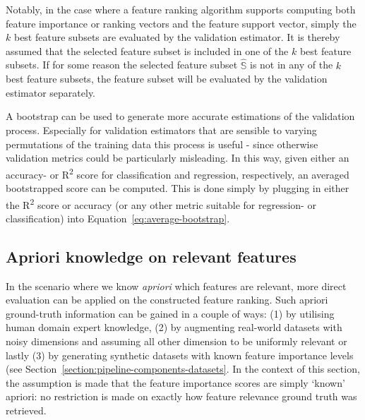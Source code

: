 \documentclass[../main.tex]{subfiles}
\begin{document}
Notably, in the case where a feature ranking algorithm supports computing both feature importance or ranking vectors and the feature support vector, simply the $k$ best feature subsets are evaluated by the validation estimator. It is thereby assumed that the selected feature subset is included in one of the $k$ best feature subsets. If for some reason the selected feature subset $\hat{\mathbb{S}}$ is not in any of the $k$ best feature subsets, the feature subset will be evaluated by the validation estimator separately.

A bootstrap can be used to generate more accurate estimations of the validation process. Especially for validation estimators that are sensible to varying permutations of the training data this process is useful - since otherwise validation metrics could be particularly misleading. In this way, given either an accuracy- or R\textsuperscript{2} score for classification and regression, respectively, an averaged bootstrapped score can be computed. This is done simply by plugging in either the R\textsuperscript{2} score or accuracy (or any other metric suitable for regression- or classification) into Equation~\ref{eq:average-bootstrap}.





\subsection{Apriori knowledge on relevant features}\label{section:evaluation-apriori-knowledge}
In the scenario where we know \textit{\gls{apriori}} which features are relevant, more direct evaluation can be applied on the constructed feature ranking. Such apriori ground-truth information can be gained in a couple of ways: (1) by utilising human domain expert knowledge, (2) by augmenting real-world datasets with noisy dimensions and assuming all other dimension to be uniformly relevant or lastly (3) by generating synthetic datasets with known feature importance levels (see Section~\ref{section:pipeline-components-datasets}. In the context of this section, the assumption is made that the feature importance scores are simply `known' apriori: no restriction is made on exactly how feature relevance ground truth was retrieved.
\end{document}
